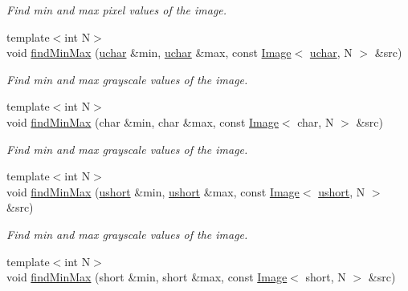 \begin{DoxyCompactItemize}
\begin{DoxyCompactList}\small\item\em Find min and max pixel values of the image. \end{DoxyCompactList}\item 
\hypertarget{group___image_gaf693613759a2128fc40efb937bc98de7}{{\footnotesize template$<$int N$>$ }\\void \hyperlink{group___image_gaf693613759a2128fc40efb937bc98de7}{find\-Min\-Max} (\hyperlink{group___eigen_typedefs_ga65f85814a8290f9797005d3b28e7e5fc}{uchar} \&min, \hyperlink{group___eigen_typedefs_ga65f85814a8290f9797005d3b28e7e5fc}{uchar} \&max, const \hyperlink{class_d_o_1_1_image}{Image}$<$ \hyperlink{group___eigen_typedefs_ga65f85814a8290f9797005d3b28e7e5fc}{uchar}, N $>$ \&src)}\label{group___image_gaf693613759a2128fc40efb937bc98de7}

\begin{DoxyCompactList}\small\item\em Find min and max grayscale values of the image. \end{DoxyCompactList}\item 
\hypertarget{group___image_gae77f9fc828bccd7a66f092b5f0a9b5d3}{{\footnotesize template$<$int N$>$ }\\void \hyperlink{group___image_gae77f9fc828bccd7a66f092b5f0a9b5d3}{find\-Min\-Max} (char \&min, char \&max, const \hyperlink{class_d_o_1_1_image}{Image}$<$ char, N $>$ \&src)}\label{group___image_gae77f9fc828bccd7a66f092b5f0a9b5d3}

\begin{DoxyCompactList}\small\item\em Find min and max grayscale values of the image. \end{DoxyCompactList}\item 
\hypertarget{group___image_ga2e0de156bfbfe1e71de0fa87c3c4dd3b}{{\footnotesize template$<$int N$>$ }\\void \hyperlink{group___image_ga2e0de156bfbfe1e71de0fa87c3c4dd3b}{find\-Min\-Max} (\hyperlink{group___eigen_typedefs_gab95f123a6c9bcfee6a343170ef8c5f69}{ushort} \&min, \hyperlink{group___eigen_typedefs_gab95f123a6c9bcfee6a343170ef8c5f69}{ushort} \&max, const \hyperlink{class_d_o_1_1_image}{Image}$<$ \hyperlink{group___eigen_typedefs_gab95f123a6c9bcfee6a343170ef8c5f69}{ushort}, N $>$ \&src)}\label{group___image_ga2e0de156bfbfe1e71de0fa87c3c4dd3b}

\begin{DoxyCompactList}\small\item\em Find min and max grayscale values of the image. \end{DoxyCompactList}\item 
\hypertarget{group___image_ga12e66e7dfc90903cf9cda77e1ee9caa1}{{\footnotesize template$<$int N$>$ }\\void \hyperlink{group___image_ga12e66e7dfc90903cf9cda77e1ee9caa1}{find\-Min\-Max} (short \&min, short \&max, const \hyperlink{class_d_o_1_1_image}{Image}$<$ short, N $>$ \&src)}\label{group___image_ga12e66e7dfc90903cf9cda77e1ee9caa1}


\end{DoxyCompactItemize}
